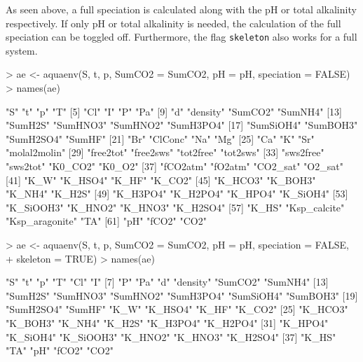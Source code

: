 \documentclass[article,nojss]{jss}
\begin{document}
As seen above, a full speciation is calculated along with the pH or total alkalinity respectively. If only pH or total alkalinity is needed, 
the calculation of the full speciation can be toggled off. Furthermore, the flag \texttt{skeleton} also works for a full system.

\begin{Schunk}
\begin{Sinput}
> ae <- aquaenv(S, t, p, SumCO2 = SumCO2, pH = pH, speciation = FALSE)
> names(ae)
\end{Sinput}
\begin{Soutput}
 [1] "S"             "t"             "p"             "T"            
 [5] "Cl"            "I"             "P"             "Pa"           
 [9] "d"             "density"       "SumCO2"        "SumNH4"       
[13] "SumH2S"        "SumHNO3"       "SumHNO2"       "SumH3PO4"     
[17] "SumSiOH4"      "SumBOH3"       "SumH2SO4"      "SumHF"        
[21] "Br"            "ClConc"        "Na"            "Mg"           
[25] "Ca"            "K"             "Sr"            "molal2molin"  
[29] "free2tot"      "free2sws"      "tot2free"      "tot2sws"      
[33] "sws2free"      "sws2tot"       "K0_CO2"        "K0_O2"        
[37] "fCO2atm"       "fO2atm"        "CO2_sat"       "O2_sat"       
[41] "K_W"           "K_HSO4"        "K_HF"          "K_CO2"        
[45] "K_HCO3"        "K_BOH3"        "K_NH4"         "K_H2S"        
[49] "K_H3PO4"       "K_H2PO4"       "K_HPO4"        "K_SiOH4"      
[53] "K_SiOOH3"      "K_HNO2"        "K_HNO3"        "K_H2SO4"      
[57] "K_HS"          "Ksp_calcite"   "Ksp_aragonite" "TA"           
[61] "pH"            "fCO2"          "CO2"          
\end{Soutput}
\begin{Sinput}
> ae <- aquaenv(S, t, p, SumCO2 = SumCO2, pH = pH, speciation = FALSE, 
+     skeleton = TRUE)
> names(ae)
\end{Sinput}
\begin{Soutput}
 [1] "S"        "t"        "p"        "T"        "Cl"       "I"       
 [7] "P"        "Pa"       "d"        "density"  "SumCO2"   "SumNH4"  
[13] "SumH2S"   "SumHNO3"  "SumHNO2"  "SumH3PO4" "SumSiOH4" "SumBOH3" 
[19] "SumH2SO4" "SumHF"    "K_W"      "K_HSO4"   "K_HF"     "K_CO2"   
[25] "K_HCO3"   "K_BOH3"   "K_NH4"    "K_H2S"    "K_H3PO4"  "K_H2PO4" 
[31] "K_HPO4"   "K_SiOH4"  "K_SiOOH3" "K_HNO2"   "K_HNO3"   "K_H2SO4" 
[37] "K_HS"     "TA"       "pH"       "fCO2"     "CO2"     
\end{Soutput}
\end{Schunk}
\end{document}
